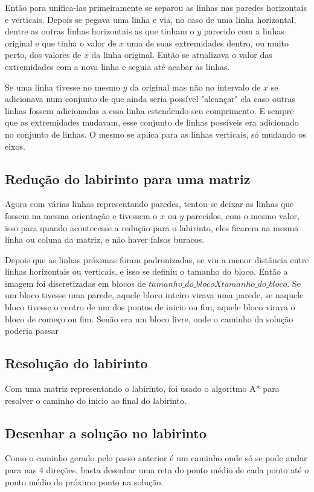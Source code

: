 \documentclass[conference]{IEEEtran}
\begin{document}
Então para unifica-las primeiramente se separou as linhas nas paredes horizontais e verticais. Depois se pegava uma linha e via, no caso de uma linha horizontal, dentre as outras linhas horizontais as que tinham o \(y\) parecido com a linhas original e que tinha o valor de \(x\) uma de suas extremidades dentro, ou muito perto, dos valores de \(x\) da linha original. Então se atualizava o valor das extremidades com a nova linha e seguia até acabar as linhas.

Se uma linha tivesse no mesmo \(y\) da original mas não no intervalo de \(x\) se adicionava num conjunto de que ainda seria possível "alcançar" ela caso outras linhas fossem adicionadas a essa linha estendendo seu comprimento. E sempre que as extremidades mudavam, esse conjunto de linhas possíveis era adicionado no conjunto de linhas. O mesmo se aplica para as linhas verticais, só mudando os eixos.

\subsection{Redução do labirinto para uma matriz}
Agora com várias linhas representando paredes, tentou-se deixar as linhas que fossem na mesma orientação e tivessem o \(x\) ou \(y\) parecidos, com o mesmo valor, isso para quando acontecesse a redução para o labirinto, eles ficarem na mesma linha ou coluna da matriz, e não haver falsos buracos.

Depois que as linhas próximas foram padronizadas, se viu a menor distância entre linhas horizontais ou verticais, e isso se definiu o tamanho do bloco. Então a imagem foi discretizadas em blocos de \(tamanho\_do\_bloco X tamanho\_do\_bloco\). Se um bloco tivesse uma parede, aquele bloco inteiro virava uma parede, se naquele bloco tivesse o centro de um dos pontos de inicio ou fim, aquele bloco virava o bloco de começo ou fim. Senão era um bloco livre, onde o caminho da solução poderia passar
\subsection{Resolução do labirinto}
Com uma matriz representando o labirinto, foi usado o algoritmo A* para resolver o caminho do inicio ao final do labirinto.
\subsection{Desenhar a solução no labirinto}
Como o caminho gerado pelo passo anterior é um caminho onde só se pode andar para nas 4 direções, basta desenhar uma reta do ponto médio de cada ponto até o ponto médio do próximo ponto na solução.
\end{document}
